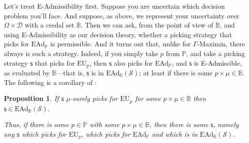 \documentclass[a4paper]{article}
\newtheorem{proposition}[theorem]{Proposition}
\newcommand\D{\mathcal{D}}
\newcommand\s{\mathsf{s}}
\renewcommand\P{\mathbb{P}} %
\newcommand\EU{\mathrm{EU}}
\newcommand\EAd{\mathrm{EAd}}
\newcommand{\IB}{\mathbb{B}}
\newcommand{\IP}{\P}
\renewcommand{\color}[1]{}
\newcommand{\Strategies}{\mathcal{S}}
\newenvironment{CCM rewritten}
{\begingroup\color{blue}} %
{\endgroup}              %
\begin{document}
Let's treat E-Admissibility first. Suppose you are uncertain which decision problem you'll face. And suppose, as above, we represent your uncertainty over $\Omega \times \D$ with a credal set $\IB$. 
 Then we can ask, from the point of view of $\IB$, and using E-Admissibility as our decision theory, whether a picking strategy that picks for $\EAd_\IP$ is permissible. And it turns out that, unlike for $\Gamma$-Maximin, there always is such a strategy. Indeed, if you simply take $p$ from $\IP$, and take a picking strategy $\s$ that picks for $\EU_p$, then $\s$ also picks for $\EAd_\IP$, and $\s$ is E-Admissible, as evaluated by $\IB$---that is, $\s$ is in $\EAd_\IB(\Strategies)$; at least if there is some $p\times\mu\in\IB$. The following is a corollary of :
 \begin{proposition}\label{thm:ead-suff-indep}
 		If $\s$ $\mu$-surely picks for $\EU_p$ for some $p\times \mu\in \IB$ then $\s\in\EAd_\IB(\Strategies)$. 
 	
 	Thus, if there is some $p\in\IP$ with some $p\times\mu\in \IB$, then there is some $\s$, namely any $\s$ which picks for $\EU_p$, which picks for $\EAd_\IP$ and which is in $\EAd_\IB(\Strategies)$. 
 \end{proposition}
 
\end{document}
